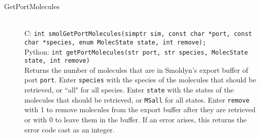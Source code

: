 \documentclass {book}
\begin{document}
\begin{description}
\item[GetPortMolecules]
\hfill \\
C: \texttt{int smolGetPortMolecules(simptr sim, const char *port, const char *species, enum MolecState state, int remove);}\\
Python: \texttt{int getPortMolecules(str port, str species, MolecState state, int remove)}\\
Returns the number of molecules that are in Smoldyn's export buffer of port \texttt{port}. Enter \texttt{species} with the species of the molecules that should be retrieved, or ``all" for all species. Enter \texttt{state} with the states of the molecules that should be retrieved, or \texttt{MSall} for all states. Enter \texttt{remove} with 1 to remove molecules from the export buffer after they are retrieved or with 0 to leave them in the buffer. If an error arises, this returns the error code cast as an integer.

\end{description}
\end{document}
